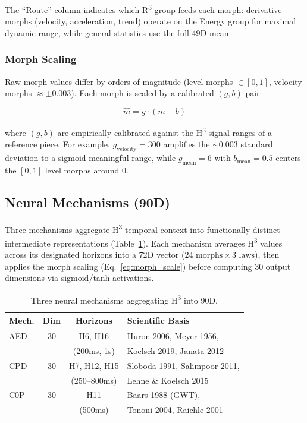 \documentclass[10pt,twocolumn]{article}
\newcommand{\Rtri}{R\textsuperscript{3}}
\newcommand{\Htri}{H\textsuperscript{3}}
\begin{document}
\noindent The ``Route'' column indicates which \Rtri{} group feeds each morph: derivative morphs (velocity, acceleration, trend) operate on the Energy group for maximal dynamic range, while general statistics use the full 49D mean.

\subsubsection{Morph Scaling}

Raw morph values differ by orders of magnitude (level morphs $\in [0,1]$, velocity morphs $\approx \pm 0.003$). Each morph is scaled by a calibrated $(g, b)$ pair:

\begin{equation}
\hat{m} = g \cdot (m - b)
\label{eq:morph_scale}
\end{equation}

\noindent where $(g, b)$ are empirically calibrated against the \Htri{} signal ranges of a reference piece. For example, $g_\text{velocity} = 300$ amplifies the $\sim$0.003 standard deviation to a sigmoid-meaningful range, while $g_\text{mean} = 6$ with $b_\text{mean} = 0.5$ centers the $[0,1]$ level morphs around 0.


\subsection{Neural Mechanisms (90D)}
\label{sec:mechanisms}

Three mechanisms aggregate \Htri{} temporal context into functionally distinct intermediate representations (Table~\ref{tab:mechanisms}). Each mechanism averages \Htri{} values across its designated horizons into a 72D vector ($24 \text{ morphs} \times 3 \text{ laws}$), then applies the morph scaling (Eq.~\ref{eq:morph_scale}) before computing 30 output dimensions via sigmoid/tanh activations.

\begin{table}[t]
\centering
\caption{Three neural mechanisms aggregating \Htri{} into 90D.}
\label{tab:mechanisms}
\small
\begin{tabular}{@{}lccl@{}}
\toprule
\textbf{Mech.} & \textbf{Dim} & \textbf{Horizons} & \textbf{Scientific Basis} \\
\midrule
AED & 30 & H6, H16 & Huron 2006, Meyer 1956, \\
    &    & (200ms, 1s) & Koelsch 2019, Janata 2012 \\
CPD & 30 & H7, H12, H15 & Sloboda 1991, Salimpoor 2011, \\
    &    & (250--800ms) & Lehne \& Koelsch 2015 \\
C0P & 30 & H11 & Baars 1988 (GWT), \\
    &    & (500ms) & Tononi 2004, Raichle 2001 \\
\bottomrule
\end{tabular}
\end{table}
\end{document}
